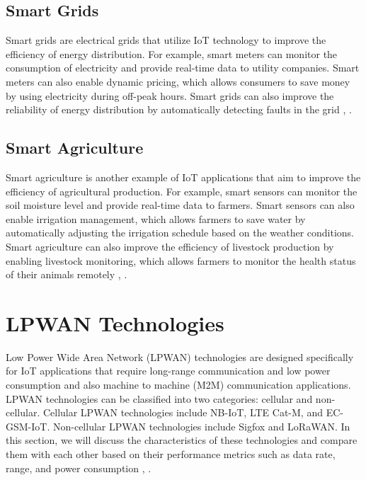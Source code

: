 \subsection*{Smart Grids}
Smart grids are electrical grids that utilize IoT technology to improve the efficiency of energy distribution. For example, smart meters can monitor the consumption of electricity and provide real-time data to utility companies. Smart meters can also enable dynamic pricing, which allows consumers to save money by using electricity during off-peak hours. Smart grids can also improve the reliability of energy distribution by automatically detecting faults in the grid \cite{javapoint-iot}, \cite{iot-overview}. 

\subsection*{Smart Agriculture}
Smart agriculture is another example of IoT applications that aim to improve the efficiency of agricultural production. For example, smart sensors can monitor the soil moisture level and provide real-time data to farmers. Smart sensors can also enable irrigation management, which allows farmers to save water by
automatically adjusting the irrigation schedule based on the weather conditions. Smart agriculture can also improve the efficiency of livestock production by enabling livestock monitoring, which allows farmers to monitor the health status of their animals remotely \cite{ibm-iot}, \cite{javapoint-iot}.

\section{LPWAN Technologies}
Low Power Wide Area Network (LPWAN) technologies are designed specifically for IoT applications that require long-range communication and low power consumption and also machine to machine (M2M) communication applications. LPWAN technologies can be classified into two categories: cellular and non-cellular. Cellular LPWAN technologies include NB-IoT, LTE Cat-M, and EC-GSM-IoT.
Non-cellular LPWAN technologies include Sigfox and LoRaWAN. In this section, we will discuss the characteristics of these technologies and compare them with each other based on their performance metrics such as data rate, range, and power consumption \cite{LPWAN-Considerations}, \cite{LPWAN-overview}.

